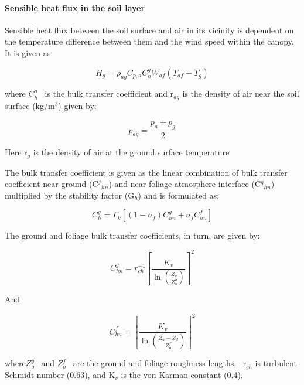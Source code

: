 \paragraph{Sensible heat flux in the soil layer}\label{sensible-heat-flux-in-the-soil-layer}

Sensible heat flux between the soil surface and air in its vicinity is dependent on the temperature difference between them and the wind speed within the canopy. It is given as

\begin{equation}
{H_g} = {\rho_{ag}}{C_{p,a}}C_h^g{W_{af}}({T_{af}} - {T_g})
\end{equation}

where \(C_h^g\) ~is the bulk transfer coefficient and r\(_{ag}\) is the density of air near the soil surface (kg/m\(^{3}\)) given by:

\begin{equation}
{p_{ag}} = \frac{{{p_a} + {p_g}}}{2}
\end{equation}

Here r\(_{g}\) is the density of air at the ground surface temperature

The bulk transfer coefficient is given as the linear combination of bulk transfer coefficient near ground (C\(^{f}\)\(_{hn}\)) and near foliage-atmosphere interface (C\(^{g}\)\(_{hn}\)) multiplied by the stability factor (G\(_{h}\)) and is formulated as:

\begin{equation}
C_h^g = {\Gamma_k}\left[ {\left( {1 - {\sigma_f}} \right)C_{hn}^g + {\sigma_f}C_{hn}^f} \right]
\end{equation}

The ground and foliage bulk transfer coefficients, in turn, are given by:

\begin{equation}
C_{hn}^g = r_{ch}^{ - 1}{\left[ {\frac{{{K_v}}}{{\ln \left( \frac{Z_a}{Z_o^g} \right)}}} \right]^2}
\end{equation}

And

\begin{equation}
C_{hn}^f = {\left[ {\frac{{K_v}}{{\ln \left( \frac{{Z_a} - {Z_d}}{Z_o^f} \right)}}} \right]^2}
\end{equation}

where\(Z_o^g\) ~and \(Z_o^f\) ~are the ground and foliage roughness lengths,~ r\(_{ch}\) is turbulent Schmidt number (0.63), and K\(_{v}\) is the von Karman constant (0.4).

